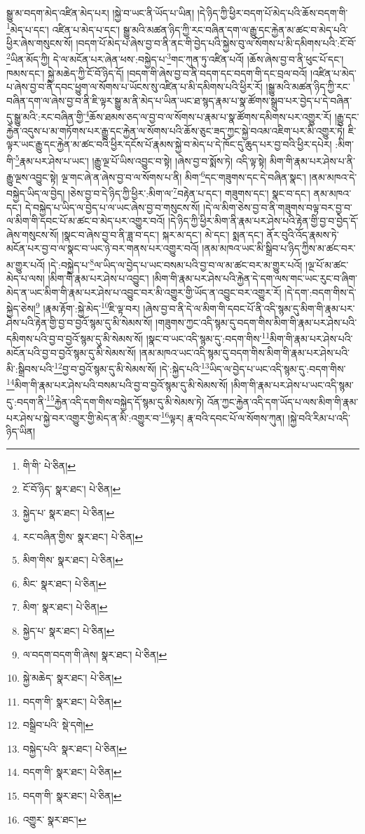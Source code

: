སྒྱུ་མ་བདག་མེད་འཛིན་མེད་པར། །སྐྱེ་བ་ཡང་ནི་ཡོད་པ་ཡིན། །དེ་ཉིད་ཀྱི་ཕྱིར་བདག་པོ་མེད་པའི་ཆོས་བདག་གི་\footnote{གི་གི་  པེ་ཅིན། }མེད་པ་དང་། འཛིན་པ་མེད་པ་དང་། སྒྱུ་མའི་མཚན་ཉིད་ཀྱི་རང་བཞིན་དག་ལ་རྒྱུ་དང་རྐྱེན་མ་ཚང་བ་མེད་པའི་ཕྱིར་ཞེས་གསུངས་སོ། །བདག་པོ་མེད་པ་ཞེས་བྱ་བ་ནི་ནང་གི་བྱེད་པའི་སྐྱེས་བུ་ལ་སོགས་པ་མི་དམིགས་པའི་:ངོ་བོ་\footnote{ངོ་བོ་ཉིད་  སྣར་ཐང་།  པེ་ཅིན། }ཡིན་མོད་ཀྱི། དེ་ལ་མངོན་པར་ཞེན་ཕས་:བསྐྱེད་པ་\footnote{སྐྱེད་པ་  སྣར་ཐང་།  པེ་ཅིན། }གང་ཀུན་ཏུ་འཛིན་པའོ། །ཆོས་ཞེས་བྱ་བ་ནི་ཕུང་པོ་དང་། ཁམས་དང་། སྐྱེ་མཆེད་ཀྱི་ངོ་བོ་ཉིད་དོ། །བདག་གི་ཞེས་བྱ་བ་ནི་བདག་དང་བདག་གི་དང་བྲལ་བའོ། །འཛིན་པ་མེད་པ་ཞེས་བྱ་བ་ནི་དབང་ཕྱུག་ལ་སོགས་པ་ཡོངས་སུ་འཛིན་པ་མི་དམིགས་པའི་ཕྱིར་རོ། །སྒྱུ་མའི་མཚན་ཉིད་ཀྱི་རང་བཞིན་དག་ལ་ཞེས་བྱ་བ་ནི་ཇི་ལྟར་སྒྱུ་མ་ནི་མེད་པ་ཡིན་ཡང་ཐ་སྙད་རྣམ་པ་སྣ་ཚོགས་སྒྲུབ་པར་བྱེད་པ་དེ་བཞིན་དུ་སྒྱུ་མའི་:རང་བཞིན་གྱི་\footnote{རང་བཞིན་གྱིས་  སྣར་ཐང་།  པེ་ཅིན། }ཆོས་ཐམས་ཅད་ལ་བྱ་བ་ལ་སོགས་པ་རྣམ་པ་སྣ་ཚོགས་དམིགས་པར་འགྱུར་རོ། །རྒྱུ་དང་རྐྱེན་འདུས་པ་མ་གཏོགས་པར་རྒྱུ་དང་རྐྱེན་ལ་སོགས་པའི་ཆོས་ཅུང་ཟད་ཀྱང་སྐྱེ་བའམ་འཇིག་པར་མི་འགྱུར་ཏེ། ཇི་ལྟར་ཡང་རྒྱུ་དང་རྐྱེན་མ་ཚང་བའི་ཕྱིར་དངོས་པོ་རྣམས་སྐྱེ་བ་མེད་པ་དེ་ཁོང་དུ་ཆུད་པར་བྱ་བའི་ཕྱིར་དཔེར། :མིག་གི་\footnote{མིག་གིས་  སྣར་ཐང་།  པེ་ཅིན། }རྣམ་པར་ཤེས་པ་ཡང་། །རྒྱུ་ལྔ་པོ་ཡིས་འབྱུང་བ་སྟེ། །ཞེས་བྱ་བ་སྨོས་ཏེ། འདི་ལྟ་སྟེ། མིག་གི་རྣམ་པར་ཤེས་པ་ནི་རྒྱུ་ལྔས་འབྱུང་སྟེ། ལྔ་གང་ཞེ་ན་ཞེས་བྱ་བ་ལ་སོགས་པ་ནི། མིག་\footnote{མིང་  སྣར་ཐང་།  པེ་ཅིན། }དང་གཟུགས་དང་དེ་བཞིན་སྣང་། །ནམ་མཁའ་དེ་བསྐྱེད་ཡིད་ལ་བྱེད། །ཅེས་བྱ་བ་དེ་ཉིད་ཀྱི་ཕྱིར་:མིག་ལ་\footnote{མིག་  སྣར་ཐང་།  པེ་ཅིན། }བརྟེན་པ་དང་། གཟུགས་དང་། སྣང་བ་དང་། ནམ་མཁའ་དང་། དེ་བསྐྱེད་པ་ཡིད་ལ་བྱེད་པ་ལ་ཡང་ཞེས་བྱ་བ་གསུངས་སོ། །དེ་ལ་མིག་ཅེས་བྱ་བ་ནི་གཟུགས་བལྟ་བར་བྱ་བ་ལ་མིག་གི་དབང་པོ་མ་ཚང་བ་མེད་པར་འགྱུར་བའོ། །དེ་ཉིད་ཀྱི་ཕྱིར་མིག་ནི་རྣམ་པར་ཤེས་པའི་རྟེན་གྱི་བྱ་བ་བྱེད་དོ་ཞེས་གསུངས་སོ། །སྣང་བ་ཞེས་བྱ་བ་ནི་ཟླ་བ་དང་། སྐར་མ་དང་། མེ་དང་། སྨན་དང་། ནོར་བུའི་འོད་རྣམས་ཏེ་མངོན་པར་བྱ་བ་ལ་སྣང་བ་ཡང་ཉེ་བར་གནས་པར་འགྱུར་བའོ། །ནམ་མཁའ་ཡང་མི་སྒྲིབ་པ་ཉིད་ཀྱིས་མ་ཚང་བར་མ་གྱུར་པའོ། །དེ་:བསྐྱེད་པ་\footnote{སྐྱེད་པ་  སྣར་ཐང་།  པེ་ཅིན། }ལ་ཡིད་ལ་བྱེད་པ་ཡང་བསམ་པའི་བྱ་བ་ལ་མ་ཚང་བར་མ་གྱུར་པའོ། །ལྔ་པོ་མ་ཚང་མེད་པ་ལས། །མིག་གི་རྣམ་པར་ཤེས་པ་འབྱུང་། །མིག་གི་རྣམ་པར་ཤེས་པའི་རྐྱེན་དེ་དག་ལས་གང་ཡང་རུང་བ་ཞིག་མེད་ན་ཡང་མིག་གི་རྣམ་པར་ཤེས་པ་འབྱུང་བར་མི་འགྱུར་གྱི་ཡོད་ན་འབྱུང་བར་འགྱུར་རོ། །དེ་དག་:བདག་གིས་དེ་སྐྱེད་ཅེས།\footnote{ལ་བདག་བདག་གི་ཞེས།  སྣར་ཐང་།  པེ་ཅིན། } །རྣམ་རྟོག་:སྐྱེ་མེད་\footnote{སྐྱེ་མཆེད་  སྣར་ཐང་།  པེ་ཅིན། }ཇི་ལྟ་བར། །ཞེས་བྱ་བ་ནི་དེ་ལ་མིག་གི་དབང་པོ་ནི་འདི་སྙམ་དུ་མིག་གི་རྣམ་པར་ཤེས་པའི་རྟེན་གྱི་བྱ་བ་བྱའོ་སྙམ་དུ་མི་སེམས་སོ། །གཟུགས་ཀྱང་འདི་སྙམ་དུ་བདག་གིས་མིག་གི་རྣམ་པར་ཤེས་པའི་དམིགས་པའི་བྱ་བ་བྱའོ་སྙམ་དུ་མི་སེམས་སོ། །སྣང་བ་ཡང་འདི་སྙམ་དུ་:བདག་གིས་\footnote{བདག་གི་  སྣར་ཐང་།  པེ་ཅིན། }མིག་གི་རྣམ་པར་ཤེས་པའི་མངོན་པའི་བྱ་བ་བྱའོ་སྙམ་དུ་མི་སེམས་སོ། །ནམ་མཁའ་ཡང་འདི་སྙམ་དུ་བདག་གིས་མིག་གི་རྣམ་པར་ཤེས་པའི་མི་:སྒྲིབས་པའི་\footnote{བསྒྲིབ་པའི་  སྡེ་དགེ། }བྱ་བ་བྱའོ་སྙམ་དུ་མི་སེམས་སོ། །དེ་:སྐྱེད་པའི་\footnote{བསྐྱེད་པའི་  སྣར་ཐང་།  པེ་ཅིན། }ཡིད་ལ་བྱེད་པ་ཡང་འདི་སྙམ་དུ་:བདག་གིས་\footnote{བདག་གི་  སྣར་ཐང་།  པེ་ཅིན། }མིག་གི་རྣམ་པར་ཤེས་པའི་བསམ་པའི་བྱ་བ་བྱའོ་སྙམ་དུ་མི་སེམས་སོ། །མིག་གི་རྣམ་པར་ཤེས་པ་ཡང་འདི་སྙམ་དུ་:བདག་ནི་\footnote{བདག་གི་  སྣར་ཐང་།  པེ་ཅིན། }རྐྱེན་འདི་དག་གིས་བསྐྱེད་དོ་སྙམ་དུ་མི་སེམས་ཏེ། འོན་ཀྱང་རྐྱེན་འདི་དག་ཡོད་པ་ལས་མིག་གི་རྣམ་པར་ཤེས་པ་སྐྱེ་བར་འགྱུར་གྱི་མེད་ན་མི་:འགྱུར་བ་\footnote{འགྱུར་  སྣར་ཐང་། }ལྟར། རྣ་བའི་དབང་པོ་ལ་སོགས་ཀུན། །སྐྱེ་བའི་རིམ་པ་འདི་ཉིད་ཡིན། 